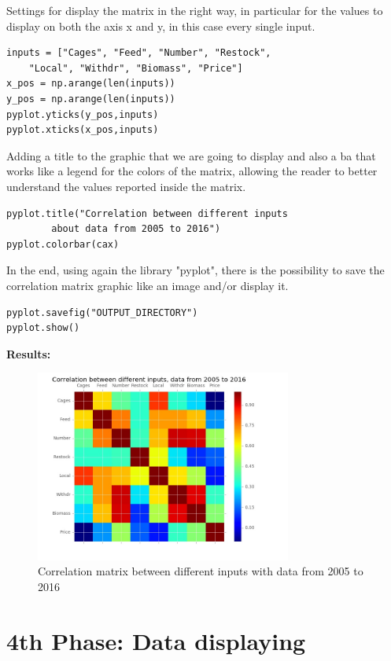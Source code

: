 Settings for display the matrix in the right way, in particular for the values to display on both the axis x and y, in this case every single input.
\begin{lstlisting}
inputs = ["Cages", "Feed", "Number", "Restock",
	"Local", "Withdr", "Biomass", "Price"]
x_pos = np.arange(len(inputs))
y_pos = np.arange(len(inputs))
pyplot.yticks(y_pos,inputs)
pyplot.xticks(x_pos,inputs)
\end{lstlisting}

Adding a title to the graphic that we are going to display and also a ba that works like a legend for the colors of the matrix, allowing the reader to better understand the values reported inside the matrix.
\begin{lstlisting}
pyplot.title("Correlation between different inputs 
		about data from 2005 to 2016")
pyplot.colorbar(cax)
\end{lstlisting}

In the end, using again the library "pyplot", there is the possibility to save the correlation matrix graphic like an image and/or display it.
\begin{lstlisting}
pyplot.savefig("OUTPUT_DIRECTORY")
pyplot.show()
\end{lstlisting}

\textbf{Results:} \\

\begin{figure}[H]
	\centering
    \includegraphics[width=0.75\textwidth]{Files/Total_Dataset_Years_Matrix.jpg}
    \caption{Correlation matrix between different inputs with data from 2005 to 2016}
\end{figure}


\newpage
\section{4th Phase: Data displaying}
\iffalse

